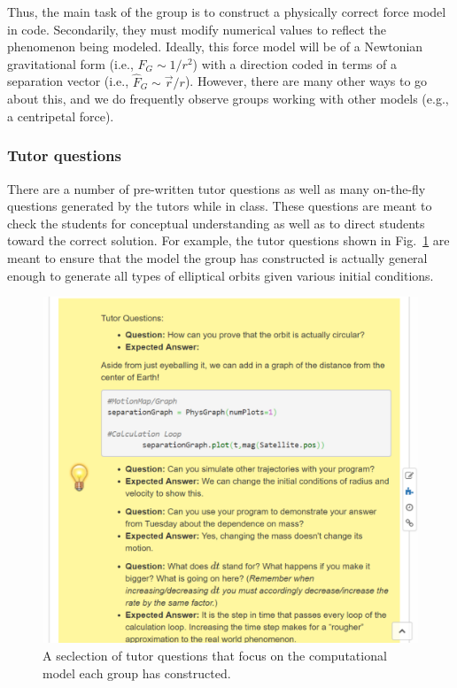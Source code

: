 \documentclass{msuphddissertation}
\begin{document}
\begin{doublespace}
Thus, the main task of the group is to construct a physically correct force model in code.  Secondarily, they must modify numerical values to reflect the phenomenon being modeled.  Ideally, this force model will be of a Newtonian gravitational form (i.e., $F_{G}\sim1/r^{2}$) with a direction coded in terms of a separation vector (i.e., $\hat{F}_{G}\sim\vec{r}/r$).  However, there are many other ways to go about this, and we do frequently observe groups working with other models (e.g., a centripetal force).

\subsubsection{Tutor questions}

There are a number of pre-written tutor questions as well as many on-the-fly questions generated by the tutors while in class.  These questions are meant to check the students for conceptual understanding as well as to direct students toward the correct solution.  For example, the tutor questions shown in Fig.~\ref{CH3:TutorQuestion} are meant to ensure that the model the group has constructed is actually general enough to generate all types of elliptical orbits given various initial conditions.

\begin{figure}[ht]\centering
\includegraphics[scale=0.5]{images/CH3TutorQuestion.pdf}
\caption{A seclection of tutor questions that focus on the computational model each group has constructed.}\label{CH3:TutorQuestion}
\end{figure}


\end{doublespace}
\end{document}
